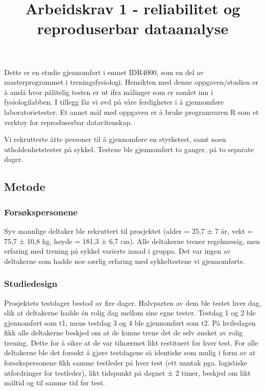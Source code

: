 \documentclass[
  letterpaper,
  DIV=11,
  numbers=noendperiod]{scrartcl}
\title{Arbeidskrav 1 - reliabilitet og reproduserbar dataanalyse}
\author{}
\date{}
\begin{document}
\maketitle
\ifdefined\Shaded\renewenvironment{Shaded}{\begin{tcolorbox}[sharp corners, enhanced, interior hidden, breakable, borderline west={3pt}{0pt}{shadecolor}, frame hidden, boxrule=0pt]}{\end{tcolorbox}}\fi

Dette er en studie gjennomført i emnet IDR4000, som en del av
masterprogrammet i treningsfysiologi. Hensikten med denne
oppgaven/studien er å anslå hvor pålitelig testen er ut ifra målinger
som er samlet inn i fysiologilabben. I tillegg får vi øvd på våre
ferdigheter i å gjennomføre laboratorietester. Et annet mål med oppgaven
er å bruke programvaren R som et verktøy for reproduserbar
datavitenskap.

Vi rekrutterte åtte personer til å gjennomføre en styrketest, samt noen
utholdenhetstester på sykkel. Testene ble gjennomført to ganger, på to
separate dager.

\hypertarget{metode}{%
\subsection{Metode}\label{metode}}

\hypertarget{forsuxf8kspersonene}{%
\subsubsection{Forsøkspersonene}\label{forsuxf8kspersonene}}

Syv mannlige deltaker ble rekruttert til prosjektet (alder = 25,7 ± 7
år, vekt = 75,7 ± 10,8 kg, høyde = 181,3 ± 6,7 cm). Alle deltakerne
trener regelmessig, men erfaring med trening på sykkel varierte innad i
gruppa. Det var ingen av deltakerne som hadde noe særlig erfaring med
sykkeltestene vi gjennomførte.

\hypertarget{studiedesign}{%
\subsubsection{Studiedesign}\label{studiedesign}}

Prosjektets testdager bestod av fire dager. Halvparten av dem ble testet
hver dag, slik at deltakerne hadde én rolig dag mellom sine egne tester.
Testdag 1 og 2 ble gjennomført som t1, mens testdag 3 og 4 ble
gjennomført som t2. På hviledagen fikk alle deltakerne beskjed om at de
kunne trene det de selv ønsket av rolig trening. Dette for å sikre at de
var tilnærmet likt restituert før hver test. For alle deltakerne ble det
forsøkt å gjøre testdagene så identiske som mulig i form av at
forsøkspersonene fikk samme testleder på hver test (ett unntak pga.
logistiske utfordringer for testleder), likt tidspunkt på døgnet ± 2
timer, beskjed om likt måltid og til samme tid før test.
\end{document}

